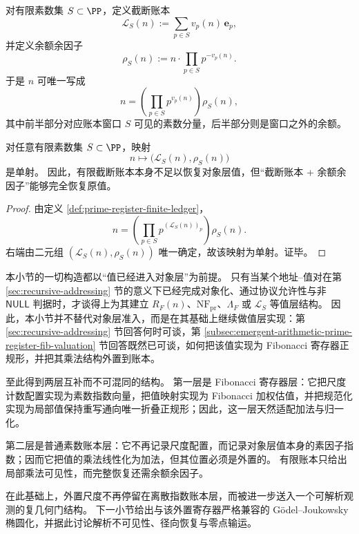 \begin{definition}[有限可见账本与余额余因子]\label{def:prime-register-finite-ledger}
对有限素数集 \(S\subset\PP\)，定义截断账本
\[
\mathcal L_S(n):=\sum_{p\in S}v_p(n)\,\mathbf e_p,
\]
并定义余额余因子
\[
\rho_S(n):=
n\cdot\prod_{p\in S}p^{-v_p(n)}.
\]
于是 \(n\) 可唯一写成
\[
n=\left(\prod_{p\in S}p^{v_p(n)}\right)\rho_S(n),
\]
其中前半部分对应账本窗口 \(S\) 可见的素数分量，后半部分则是窗口之外的余额。
\end{definition}

\begin{proposition}[有限账本的可恢复性]\label{prop:prime-register-finite-ledger-recoverability}
对任意有限素数集 \(S\subset\PP\)，映射
\[
n\longmapsto \bigl(\mathcal L_S(n),\rho_S(n)\bigr)
\]
是单射。
因此，有限截断账本本身不足以恢复对象层值，但“截断账本 + 余额余因子”能够完全恢复原值。
\end{proposition}

\begin{proof}
由定义 \ref{def:prime-register-finite-ledger}，
\[
n=
\left(\prod_{p\in S}p^{(\mathcal L_S(n))_p}\right)\rho_S(n).
\]
右端由二元组 \((\mathcal L_S(n),\rho_S(n))\) 唯一确定，故该映射为单射。证毕。
\end{proof}

\begin{remark}\label{rem:prime-register-forcing-interface}
本小节的一切构造都以“值已经进入对象层”为前提。
只有当某个地址--值对在第 \ref{sec:recursive-addressing} 节的意义下已经完成对象化、通过协议允许性与非 \(\mathsf{NULL}\) 判据时，才谈得上为其建立 \(R_F(n)\)、\(\mathrm{NF}_{\mathrm{pr}}\)、\(\Lambda_F\) 或 \(\mathcal L_S\) 等值层结构。
因此，本小节并不替代对象层准入，而是在其基础上继续做值层实现：第 \ref{sec:recursive-addressing} 节回答何时可谈，第 \ref{subsec:emergent-arithmetic-prime-register-fib-valuation} 节回答既然已可谈，如何把该值实现为 Fibonacci 寄存器正规形，并把其乘法结构外置到账本。
\end{remark}

\begin{remark}[本小节的两层结构]\label{rem:prime-register-two-layer-summary}
至此得到两层互补而不可混同的结构。
第一层是 Fibonacci 寄存器层：它把尺度计数配置实现为素数指数向量，把值映射实现为 Fibonacci 加权估值，并把规范化实现为局部值保持重写通向唯一折叠正规形；因此，这一层天然适配加法与归一化。

第二层是普通素数账本层：它不再记录尺度配置，而记录对象层值本身的素因子指数；因而它把值的乘法线性化为加法，但其位置必须是外置的。
有限账本只给出局部乘法可见性，而完整恢复还需余额余因子。
\end{remark}



在此基础上，外置尺度不再停留在离散指数账本层，而被进一步送入一个可解析观测的复几何门结构。
下一小节给出与该外置寄存器严格兼容的 Gödel--Joukowsky 椭圆化，并据此讨论解析不可见性、径向恢复与零点输运。


